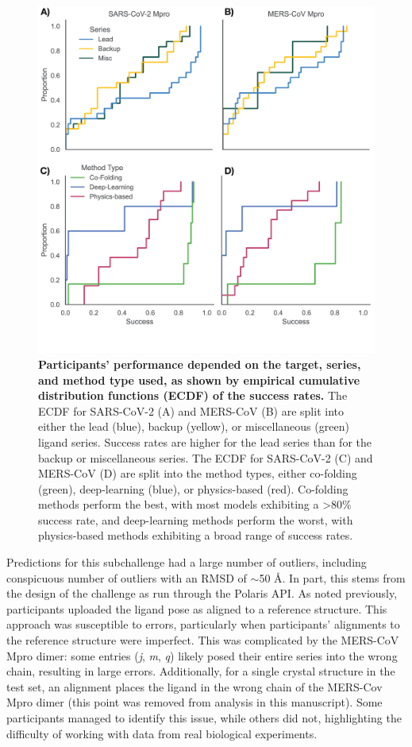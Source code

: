 \documentclass[journal=jcim,manuscript=article]{achemso}
\begin{document}
{\begin{figure}
    \includegraphics[scale=1
    ]{04_figs_leaderboards/poses_by_series_and_method.png}
  \caption{\textbf{Participants' performance depended on the target, series, and method type used, as shown by empirical cumulative distribution functions (ECDF) of the success rates.} The ECDF for SARS-CoV-2 (A) and MERS-CoV (B) are  split into either the lead (blue), backup (yellow), or miscellaneous (green) ligand series. Success rates are higher for the lead series than for the backup or miscellaneous series. The ECDF for SARS-CoV-2 (C) and MERS-CoV (D) are  split into the method types, either co-folding (green), deep-learning (blue), or physics-based (red). Co-folding methods perform the best, with most models exhibiting a \textgreater 80\% success rate, and deep-learning methods perform the worst, with physics-based methods exhibiting a broad range of success rates.}
  \label{fgr:poses_by_series_and_method}
\end{figure}


Predictions for this subchallenge had a large number of outliers, including conspicuous number of outliers with an RMSD of $\sim$50 Å. In part, this stems from the design of the challenge as run through the Polaris API. As noted previously, participants uploaded the ligand pose as aligned to a reference structure. This approach was susceptible to errors, particularly when participants’ alignments to the reference structure were imperfect. This was complicated by the MERS-CoV Mpro dimer: some entries (\textit{j}, \textit{m}, \textit{q}) likely posed their entire series into the wrong chain, resulting in large errors. Additionally, for a single crystal structure in the test set, an alignment places the ligand in the wrong chain of the MERS-Cov Mpro dimer (this point was removed from analysis in this manuscript). Some participants managed to identify this issue, while others did not, highlighting the difficulty of working with data from real biological experiments.

}
\end{document}

